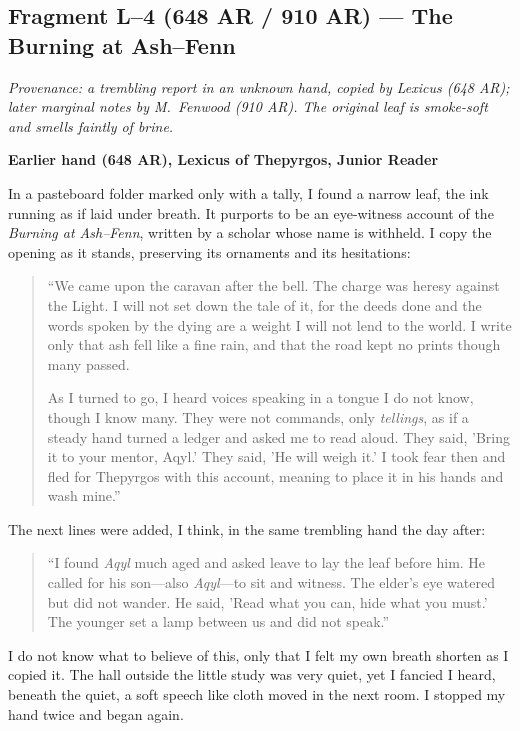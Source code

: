\documentclass[11pt]{article}
\begin{document}
\subsection*{Fragment L--4 (648 AR / 910 AR) --- The Burning at Ash--Fenn}
\label{frag:l4}
{}

\noindent\textit{Provenance: a trembling report in an unknown hand, copied by Lexicus (648 AR); later marginal notes by M.\ Fenwood (910 AR). The original leaf is smoke-soft and smells faintly of brine.}

\medskip
\noindent\textbf{Earlier hand (648 AR), Lexicus of Thepyrgos, Junior Reader}

In a pasteboard folder marked only with a tally, I found a narrow leaf, the ink running as if laid under breath. It purports to be an eye-witness account of the \textit{Burning at Ash--Fenn}, written by a scholar whose name is withheld. I copy the opening as it stands, preserving its ornaments and its hesitations:

\begin{quote}\small
``We came upon the caravan after the bell. The charge was heresy against the Light. I will not set down the tale of it, for the deeds done and the words spoken by the dying are a weight I will not lend to the world. I write only that ash fell like a fine rain, and that the road kept no prints though many passed. 

As I turned to go, I heard voices speaking in a tongue I do not know, though I know many. They were not commands, only \emph{tellings}, as if a steady hand turned a ledger and asked me to read aloud. They said, 'Bring it to your mentor, Aqyl.' They said, 'He will weigh it.' I took fear then and fled for Thepyrgos with this account, meaning to place it in his hands and wash mine.''
\end{quote}

The next lines were added, I think, in the same trembling hand the day after:

\begin{quote}\small
``I found \textit{Aqyl} much aged and asked leave to lay the leaf before him. He called for his son---also \textit{Aqyl}---to sit and witness. The elder's eye watered but did not wander. He said, 'Read what you can, hide what you must.' The younger set a lamp between us and did not speak.''
\end{quote}

I do not know what to believe of this, only that I felt my own breath shorten as I copied it. The hall outside the little study was very quiet, yet I fancied I heard, beneath the quiet, a soft speech like cloth moved in the next room. I stopped my hand twice and began again.
\end{document}
